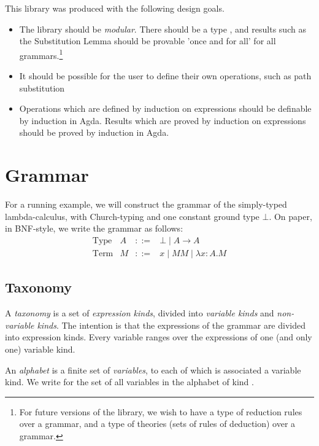 \documentclass[envcountsame]{llncs}
\begin{document}
This library was produced with the following design goals.

\begin{itemize}
\item
The library should be \emph{modular}.  There should be a type , and results such as the Substitution Lemma 
should be
provable 'once and for all' for all grammars.\footnote{For future versions of the library, we wish to have a type of reduction rules over a grammar, and a type of theories (sets of rules of deduction) over a grammar.}
\item
It should be possible for the user to define their own operations, such as path substitution %
\item
Operations which are defined by induction on expressions should be definable by induction in Agda.  Results which are proved by induction on expressions should be proved by induction in Agda.
\end{itemize}

\section{Grammar}

\begin{example}
\label{ex:stlc}
For a running example, we will construct the grammar of the simply-typed lambda-calculus, with Church-typing and one constant ground type $\bot$.  On paper, in BNF-style, we write the grammar as follows:
\[ \begin{array}{lrcl}
\text{Type} & A & ::= & \bot \mid A \rightarrow A \\
\text{Term} & M & ::= & x \mid MM \mid \lambda x : A . M
\end{array} \]
\end{example}

\subsection{Taxonomy}

A \emph{taxonomy} is a set of \emph{expression kinds}, divided into \emph{variable kinds} and \emph{non-variable kinds}.
The intention is that the expressions of the grammar are divided into expression kinds.  Every
variable ranges over the expressions of one (and only one) variable kind.


An \emph{alphabet} is a finite set of \emph{variables}, to each of which is associated a variable kind.  We write   
for the set of all variables in the alphabet  of kind .
\end{document}
